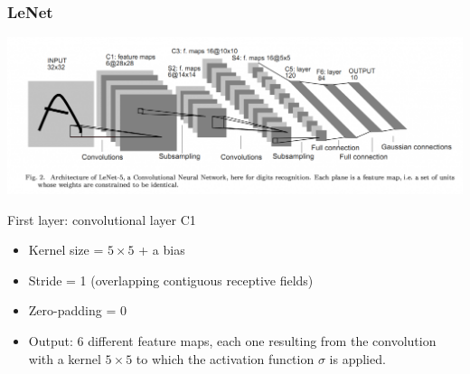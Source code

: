 \begin{frame}
	\frametitle{LeNet}



\begin{center}
	\includegraphics[scale=0.3]{figs/LeNet}
\end{center}


First layer: convolutional layer C1
\begin{itemize}
	\item Kernel size = $5 \times 5$ + a bias
	\item Stride = 1 (overlapping contiguous receptive fields)
	\item Zero-padding = 0
	\item Output: 6 different feature maps, each one resulting from the convolution with a kernel $5\times 5$ to which the activation function $\sigma$ is applied.
\end{itemize}
\end{frame}


